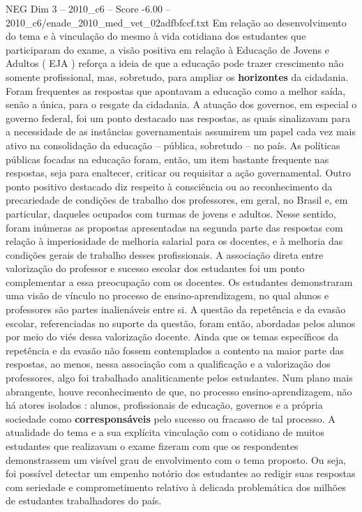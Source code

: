 \begin{textsample}{NEG Dim 3 – 2010\_c6 – Score -6.00 – 2010\_c6/enade\_2010\_med\_vet\_02adfbfccf.txt}
Em relação ao desenvolvimento do tema e à vinculação do mesmo à vida cotidiana dos estudantes que participaram do exame, a visão positiva em relação à Educação de Jovens e Adultos ( EJA ) reforça a ideia de que a educação pode trazer crescimento não somente profissional, mas, sobretudo, para ampliar os \textbf{horizontes} da cidadania.
Foram frequentes as respostas que apontavam a educação como a melhor saída, senão a única, para o resgate da cidadania.
A atuação dos governos, em especial o governo federal, foi um ponto destacado nas respostas, as quais sinalizavam para a necessidade de as instâncias governamentais assumirem um papel cada vez mais ativo na consolidação da educação – pública, sobretudo – no país.
As políticas públicas focadas na educação foram, então, um item bastante frequente nas respostas, seja para enaltecer, criticar ou requisitar a ação governamental.
Outro ponto positivo destacado diz respeito à consciência ou ao reconhecimento da precariedade de condições de trabalho dos professores, em geral, no Brasil e, em particular, daqueles ocupados com turmas de jovens e adultos.
Nesse sentido, foram inúmeras as propostas apresentadas na segunda parte das respostas com relação à imperiosidade de melhoria salarial para os docentes, e à melhoria das condições gerais de trabalho desses profissionais.
A associação direta entre valorização do professor e sucesso escolar dos estudantes foi um ponto complementar a essa preocupação com os docentes.
Os estudantes demonstraram uma visão de vínculo no processo de ensino-aprendizagem, no qual alunos e professores são partes inalienáveis entre si.
A questão da repetência e da evasão escolar, referenciadas no suporte da questão, foram então, abordadas pelos alunos por meio do viés dessa valorização docente.
Ainda que os temas específicos da repetência e da evasão não fossem contemplados a contento na maior parte das respostas, ao menos, nessa associação com a qualificação e a valorização dos professores, algo foi trabalhado analiticamente pelos estudantes.
Num plano mais abrangente, houve reconhecimento de que, no processo ensino-aprendizagem, não há atores isolados : alunos, profissionais de educação, governos e a própria sociedade como \textbf{corresponsáveis} pelo sucesso ou fracasso de tal processo.
A atualidade do tema e a sua explícita vinculação com o cotidiano de muitos estudantes que realizavam o exame fizeram com que os respondentes demonstrassem um visível grau de envolvimento com o tema proposto.
Ou seja, foi possível detectar um empenho notório dos estudantes ao redigir suas respostas com seriedade e comprometimento relativo à delicada problemática dos milhões de estudantes trabalhadores do país.

\end{textsample}
